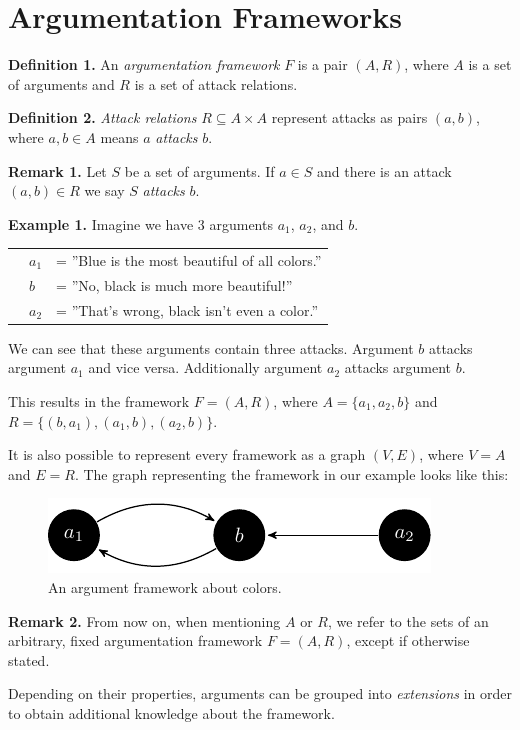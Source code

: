 \documentclass[draft,final]{vutinfth} %
\newcommand{\hl}{\par\vspace{6pt}} %
\newcommand{\cl}{\par\vspace{12pt}} %
\begin{document}
\section{Argumentation Frameworks}

\textbf{Definition 1.} An \emph{argumentation framework} $F$ is a pair $(A,R)$, where $A$ is a set of arguments and $R$ is a set of attack relations.\cl

\textbf{Definition 2.} \emph{Attack relations} $R\subseteq A\times A$ represent attacks as pairs $(a,b)$, where $a,b\in A$ means $a$ \emph{attacks} $b$.\cl

\textbf{Remark 1.} Let $S$ be a set of arguments. If $a\in S$ and there is an attack $(a,b)\in R$ we say $S$ \emph{attacks} $b$.\cl

\textbf{Example 1.} Imagine we have 3 arguments $a_1$, $a_2$, and $b$.\hl
			\begin{tabular}{p{0.5cm}p{0.5cm}l}
			& $a_1$ & = ''Blue is the most beautiful of all colors.''\\
			& $b$ & = ''No, black is much more beautiful!''\\
			& $a_2$ & = ''That's wrong, black isn't even a color.''
			\end{tabular}\hl
We can see that these arguments contain three attacks. Argument $b$ attacks argument $a_1$ and vice versa. Additionally argument $a_2$ attacks argument $b$.\hl
This results in the framework $F=(A,R)$, where $A=\{a_1,a_2,b\}$ and $R=\{(b,a_1),(a_1,b),(a_2,b)\}$.\cl

It is also possible to represent every framework as a graph $(V,E)$, where $V=A$ and $E=R$. The graph representing the framework in our example looks like this:

\FloatBarrier
	\begin{figure}[!h]
		\centering
		\includegraphics[width=\linewidth]{graphs/ex1_v2.pdf}
		\caption{An argument framework about colors.}
	\end{figure}
\FloatBarrier

\textbf{Remark 2.} From now on, when mentioning $A$ or $R$, we refer to the sets of an arbitrary, fixed argumentation framework $F=(A,R)$, except if otherwise stated.

Depending on their properties, arguments can be grouped into \emph{extensions} in order to obtain additional knowledge about the framework.\cl %
\end{document}
